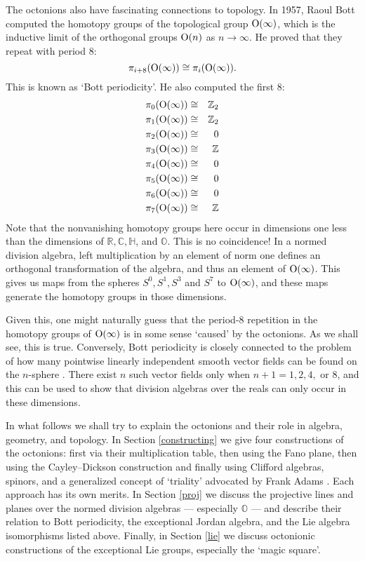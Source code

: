 \documentclass[12pt]{article}
\newcommand\Z{{\mathbb Z}}
\newcommand\R{{\mathbb R}}
\newcommand\C{{\mathbb C}}
\renewcommand\H{{\mathbb H}}
\renewcommand\O{{\mathbb O}}
\newcommand{\OO}{{\rm O}}
\newcommand{\iso}{\cong}
\newcommand{\ban}{\begin{eqnarray*}}
\newcommand{\ean}{\end{eqnarray*}}
\begin{document}
The octonions also have fascinating connections to topology.  In 1957,  
Raoul Bott computed the homotopy groups of the topological group
$\OO(\infty)$, which is the inductive limit of the orthogonal groups
$\OO(n)$ as $n \to \infty$.  He proved that they repeat with period
8:   
\[   \pi_{i+8}(\OO(\infty)) \iso \pi_i(\OO(\infty)).   \]   
This is known as `Bott periodicity'.  He also computed the first 8:   
\ban       
               \pi_0(\OO(\infty)) &\iso& \Z_2  \\    
               \pi_1(\OO(\infty)) &\iso& \Z_2  \\   
               \pi_2(\OO(\infty)) &\iso&  0    \\   
               \pi_3(\OO(\infty)) &\iso& \Z    \\   
               \pi_4(\OO(\infty)) &\iso&  0    \\   
               \pi_5(\OO(\infty)) &\iso&  0    \\   
               \pi_6(\OO(\infty)) &\iso&  0    \\   
               \pi_7(\OO(\infty)) &\iso& \Z       
\ean   
Note that the nonvanishing homotopy groups here occur in dimensions one   
less than the dimensions of $\R,\C,\H$, and $\O$.  This is no coincidence!   
In a normed division algebra, left multiplication by an element of norm   
one defines an orthogonal transformation of the algebra, and thus an   
element of $\OO(\infty)$.   This gives us maps from the spheres $S^0,    
S^1, S^3$ and $S^7$ to $\OO(\infty)$, and these maps generate the    
homotopy groups in those dimensions.     

Given this, one might naturally guess that the period-8 repetition in
the homotopy groups of $\OO(\infty)$ is in some sense `caused' by the
octonions.  As we shall see, this is true.  Conversely, Bott
periodicity is closely connected to the problem of how many pointwise
linearly independent smooth vector fields can be found on the
$n$-sphere \cite{Husemoller}.  There exist $n$ such vector fields only
when $n+1 = 1, 2, 4,$ or $8$, and this can be used to show that 
division algebras over the reals can only occur in these dimensions.

In what follows we shall try to explain the octonions and their role in 
algebra, geometry, and topology.  In Section \ref{constructing} we give 
four constructions of the octonions: first via their multiplication   
table, then using the Fano plane, then using the Cayley--Dickson   
construction and finally using Clifford algebras, spinors, and a  
generalized concept of `triality' advocated by Frank Adams \cite{Adams}.
Each approach has its own merits.  In Section \ref{proj} we discuss
the projective lines and planes over the normed division algebras --- 
especially $\O$ --- and describe their relation to Bott periodicity,  
the exceptional Jordan algebra, and the Lie algebra isomorphisms listed 
above.  Finally, in Section \ref{lie} we discuss octonionic  
constructions of the exceptional Lie groups, especially the `magic 
square'.   
   
\end{document}
